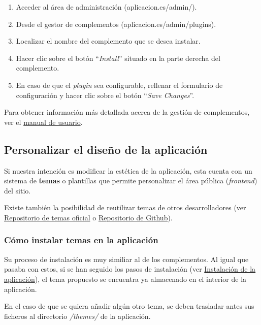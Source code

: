 \begin{enumerate}
\def\labelenumi{\arabic{enumi}.}
\tightlist
\item
  Acceder al área de administración ({aplicacion.es/admin/}).
\item
  Desde el gestor de complementos ({aplicacion.es/admin/plugins}).
\item
  Localizar el nombre del complemento que se desea instalar.
\item
  Hacer clic sobre el botón ``\emph{Install}'' situado en la parte derecha
  del complemento.
\item
  En caso de que el \emph{plugin} sea configurable, rellenar el
  formulario de configuración y hacer clic sobre el botón ``\emph{Save
  Changes}''.
\end{enumerate}

Para obtener información más detallada acerca de la gestión de
complementos, ver el
\href{https://tfg-ceniehariadne.readthedocs.io/es/latest/anexos/E_Manual_usuario.html\#manual-de-usuario}{manual
de usuario}.

\subsection{Personalizar el diseño de la aplicación}

Si nuestra intención es modificar la estética de la aplicación, esta
cuenta con un sistema de \textbf{temas} o plantillas que permite
personalizar el área pública (\emph{frontend}) del sitio.

Existe también la posibilidad de reutilizar temas de otros
desarrolladores (ver
\href{https://omeka.org/classic/themes/}{Repositorio de temas oficial} o
\href{https://daniel-km.github.io/UpgradeToOmekaS/omeka_themes.html}{Repositorio
de Github}).

\subsubsection{Cómo instalar temas en la aplicación}

Su proceso de instalación es muy similiar al de los complementos. Al
igual que pasaba con estos, si se han seguido los pasos de instalación
(ver \protect\hyperlink{instalaciuxf3n-de-la-aplicaciuxf3n}{Instalación
de la aplicación}), el tema propuesto se encuentra ya almacenado en el
interior de la aplicación.

En el caso de que se quiera añadir algún otro tema, se deben trasladar
antes sus ficheros al directorio \emph{/themes/} de la aplicación.

